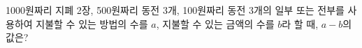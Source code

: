 1000원짜리 지폐 2장, 500원짜리 동전 3개, 100원짜리 동전 3개의 일부 또는 전부를 사용하여 지불할 수 있는 방법의 수를 $a$, 지불할 수 있는 금액의 수를 $b$라 할 때, $a-b$의 값은? 
